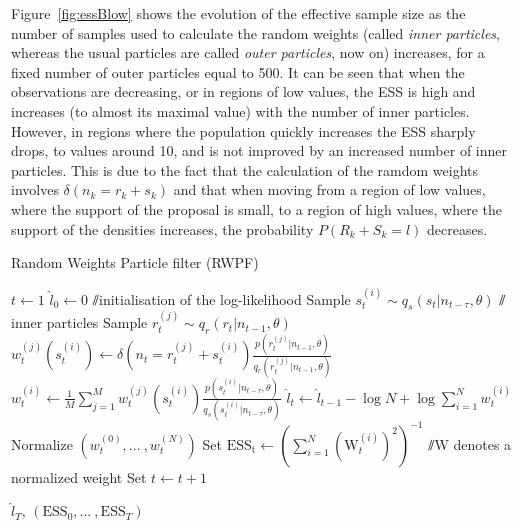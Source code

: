 \documentclass[12pt]{article}
\begin{document}
	Figure~\ref{fig:essBlow} shows the evolution of the effective sample size as the number of samples used to calculate the random weights (called \emph{inner particles}, whereas the usual particles are called \emph{outer particles}, now on) increases, for a fixed number of outer particles equal to 500. It can be seen that when the observations are decreasing, or in regions of low values, the ESS is high and increases (to almost its maximal value) with the number of inner particles. However, in regions where the population quickly increases the ESS sharply drops, to values around 10, and is not improved by an increased number of inner particles. This is due to the fact that the calculation of the ramdom weights involves $\delta(n_k = r_k+s_k)$ and that when moving from a region of low values, where the support of the proposal is small, to a region of high values, where the support of the densities increases, the probability $P(R_k+S_k=l)$ decreases.
	\begin{algorithm}
		\caption{Random Weights Particle filter (RWPF)}\label{RWPF}
		\begin{algorithmic}[1]
			\State $t \gets 1$
			\State $\hat{l}_0 \gets 0$ $\sslash$initialisation of the log-likelihood
			\State Sample $s_t^{(i)} \sim q_s(s_t| n_{t-\tau}, \theta)$
			 $\sslash$inner particles
			\State Sample $r_t^{(j)} \sim q_r(r_t| n_{t-1}, \theta)$
			\State $w_t^{(j)}(s_t^{(i)}) \gets \delta(n_t=r_t^{(j)}+s_t^{(i)})\frac{p(r_t^{(j)}| n_{t-1}, \theta)}{q_r(r_t^{(j)}| n_{t-1}, \theta)}$
			\EndFor
			\State $w_t^{(i)} \gets \frac{1}{M}\sum_{j=1}^{M}w_t^{(j)}(s_t^{(i)}) \frac{p(s_t^{(i)}| n_{t-\tau}, \theta)}{q_s(s_t^{(i)}| n_{t-\tau}, \theta)}$
			\EndFor
			\State $\hat{l}_t \gets \hat{l}_{t-1} - \log N + \log\sum_{i=1}^{N}w_t^{(i)}$
			\State Normalize $(w_t^{(0)}, \text{...}\ , w_t^{(N)})$
			\State Set $\mathrm{ESS_t} \gets (\sum_{i=1}^{N}(\mathrm{W}_t^{(i)})^2)^{-1}$ $\sslash$W denotes a normalized weight
			\State Set $t \gets t+1$
			\EndWhile
			\item[]
			\Return $\hat{l}_T$,  $(\mathrm{ESS}_0, \text{...}\ , \mathrm{ESS}_T)$
			\EndFunction
		\end{algorithmic}
	\end{algorithm}
	\vspace{15mm}
\end{document}
